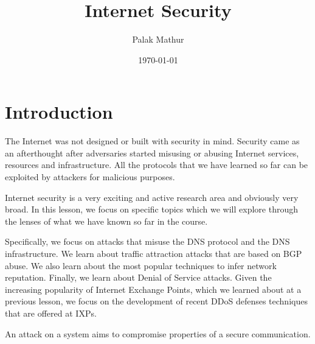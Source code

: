 \documentclass[11pt]{article}
\author{Palak Mathur}
\date{\today}
\title{Internet Security}
\begin{document}
\maketitle
\tableofcontents


\section{Introduction}
\label{sec:org05fc753}
The Internet was not designed or built with security in mind. Security came as an afterthought after adversaries started misusing or abusing Internet services, resources and infrastructure. All the protocols that we have learned so far can be exploited by attackers for malicious purposes. 

Internet security is a very exciting and active research area and obviously very broad. In this lesson, we focus on specific topics which we will explore through the lenses of what we have known so far in the course. 

Specifically, we focus on attacks that misuse the DNS protocol and the DNS infrastructure. We learn about traffic attraction attacks that are based on BGP abuse. We also learn about the most popular techniques to infer network reputation. Finally, we learn about Denial of Service attacks. Given the increasing popularity of Internet Exchange Points, which we learned about at a previous lesson, we focus on the development of recent DDoS defenses techniques that are offered at IXPs.

An attack on a system aims to compromise properties of a secure communication. 
\end{document}
